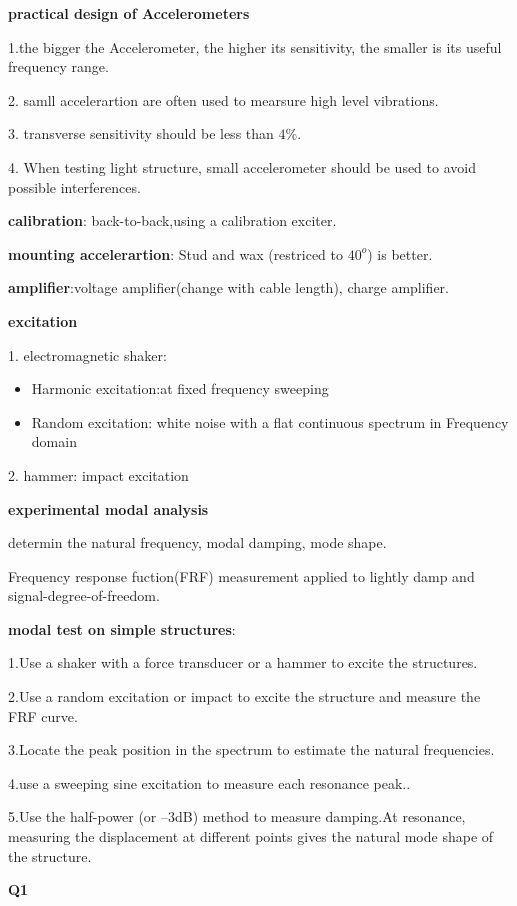 \documentclass{article}
\begin{document}
\begin{multicols*}{3}
\textbf{practical design of Accelerometers}

1.the bigger the Accelerometer, the higher its sensitivity, the smaller is its useful frequency range.

2. samll accelerartion are often used to mearsure high level vibrations.

3. transverse sensitivity should be less than $4\%$.

4. When testing light structure, small accelerometer should be used to avoid possible interferences.

\textbf{calibration}: back-to-back,using a calibration exciter.

\textbf{mounting accelerartion}: Stud and wax (restriced to $40^{o}$) is better.

\textbf{amplifier}:voltage amplifier(change with cable length), charge amplifier.

\textbf{excitation}

1. electromagnetic shaker:
\begin{itemize}
  \item Harmonic excitation:at fixed frequency sweeping
  \item Random excitation: white noise with  a flat continuous spectrum in Frequency domain
\end{itemize}

2. hammer: impact excitation

\noindent\textbf{experimental modal analysis}

determin the natural frequency, modal damping, mode shape. 

Frequency response fuction(FRF) measurement applied to lightly damp and signal-degree-of-freedom.

\textbf{modal test on simple structures}:

1.Use a shaker with a force transducer or a hammer to excite the structures.

2.Use a random excitation or impact to excite the structure and measure the FRF curve.

3.Locate the peak position in the spectrum to estimate the natural frequencies.

4.use a sweeping sine excitation to measure each resonance peak..

5.Use the half-power (or –3dB) method to measure damping.At resonance, measuring the displacement at different points gives the natural mode shape of the structure.

\noindent\textbf{Q1}


\end{multicols*}
\end{document}
